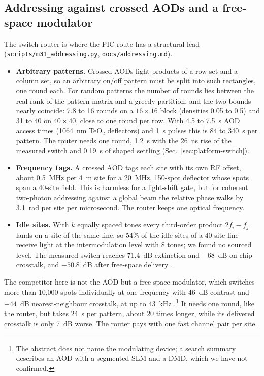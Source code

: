 \subsection{Addressing against crossed AODs and a free-space modulator}\label{sec:platform-addressing}

The switch router is where the PIC route has a structural lead (\texttt{scripts/\allowbreak m31\_addressing.py}, \texttt{docs/\allowbreak addressing.md}).
\begin{itemize}
\item \textbf{Arbitrary patterns.} Crossed AODs light products of a row set and a column set, so an arbitrary on/off pattern must be split into such rectangles, one round each. For random patterns the number of rounds lies between the real rank of the pattern matrix and a greedy partition, and the two bounds nearly coincide: 7.8 to 16 rounds on a $16\times16$ block (densities 0.05 to 0.5) and 31 to 40 on $40\times40$, close to one round per row. With 4.5 to 7.5~\textmu s AOD access times (1064~nm TeO$_2$ deflectors) and 1~\textmu s pulses this is 84 to 340~\textmu s per pattern. The router needs one round, 1.2~\textmu s with the 26~ns rise of the measured switch \cite{ZHAO} and 0.19~\textmu s of shaped settling (Sec.~\ref{sec:platform-switch}).
\item \textbf{Frequency tags.} A crossed AOD tags each site with its own RF offset, about 0.5~MHz per 4~\textmu m site for a 20~MHz, 150-spot deflector whose spots span a 40-site field. This is harmless for a light-shift gate, but for coherent two-photon addressing against a global beam the relative phase walks by 3.1~rad per site per microsecond. The router keeps one optical frequency.
\item \textbf{Idle sites.} With $k$ equally spaced tones every third-order product $2f_i-f_j$ lands on a site of the same line, so 54\% of the idle sites of a 40-site line receive light at the intermodulation level with 8 tones; we found no sourced level. The measured switch reaches 71.4~dB extinction and $-68$~dB on-chip crosstalk, and $-50.8$~dB after free-space delivery \cite{ZHAO}.
\end{itemize}
The competitor here is not the AOD but a free-space modulator, which switches more than 10,000 spots individually at one frequency with 46~dB contrast and $-44$~dB nearest-neighbour crosstalk, at up to 43~kHz \cite{zhang2024}.\footnote{The abstract does not name the modulating device; a search summary describes an AOD with a segmented SLM and a DMD, which we have not confirmed.} It needs one round, like the router, but takes 24~\textmu s per pattern, about 20 times longer, while its delivered crosstalk is only 7~dB worse. The router pays with one fast channel pair per site.

